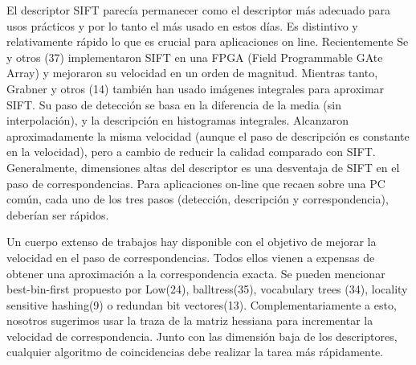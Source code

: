   El descriptor SIFT parecía permanecer como el descriptor más adecuado para usos prácticos y por lo tanto el más usado en estos días. Es distintivo y relativamente rápido lo que es crucial para aplicaciones on line. Recientemente Se y otros (37) implementaron SIFT en una FPGA (Field Programmable GAte Array) y mejoraron su velocidad en un orden de magnitud. Mientras tanto, Grabner y otros (14) también han usado imágenes integrales para aproximar SIFT. Su paso de detección se basa en la diferencia de la media (sin interpolación), y la descripción en histogramas integrales. Alcanzaron aproximadamente la misma velocidad (aunque el paso de descripción es constante en la velocidad), pero a cambio de reducir la calidad comparado con SIFT. Generalmente, dimensiones altas del descriptor es una desventaja de SIFT en el paso de correspondencias. Para aplicaciones on-line que recaen sobre una PC común, cada uno de los tres pasos (detección, descripción y correspondencia), deberían ser rápidos.

  Un cuerpo extenso de trabajos hay disponible con el objetivo de mejorar la velocidad en el paso de correspondencias. Todos ellos vienen a expensas de obtener una aproximación a la correspondencia exacta. Se pueden mencionar best-bin-first propuesto por Low(24), balltress(35), vocabulary trees (34), locality sensitive hashing(9) o redundan bit vectores(13). Complementariamente a esto, nosotros sugerimos usar la traza de la matriz hessiana para incrementar la velocidad de correspondencia. Junto con las dimensión baja de los descriptores, cualquier algoritmo de coincidencias debe realizar la tarea más rápidamente.

